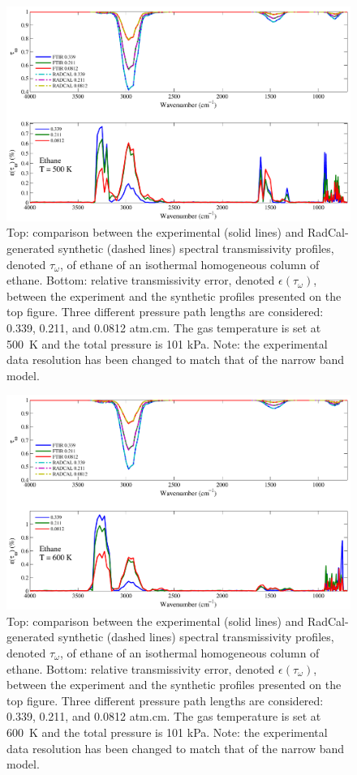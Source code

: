 \begin{figure}[p]
\includegraphics[width=\textwidth]{../Verification/Results_Test2/Ethane_500.pdf}
\caption{Top: comparison between the experimental (solid lines) and RadCal-generated synthetic (dashed lines) spectral transmissivity profiles, denoted $\tau_{\omega}$, of ethane of an isothermal homogeneous column of ethane. Bottom: relative transmissivity error, denoted $\epsilon{(\tau_{\omega})}$, between the experiment and the synthetic profiles presented on the top figure. Three different pressure path lengths are considered: 0.339, 0.211, and 0.0812 atm.cm. The gas temperature is set at 500~K and the total pressure is 101 kPa. Note: the experimental data resolution has been changed to match that of the narrow band model. \label{fig:ethane_Verify_500K}}
\end{figure}

\begin{figure}[p]
\includegraphics[width=\textwidth]{../Verification/Results_Test2/Ethane_600.pdf}
\caption{Top: comparison between the experimental (solid lines) and RadCal-generated synthetic (dashed lines) spectral transmissivity profiles, denoted $\tau_{\omega}$, of ethane of an isothermal homogeneous column of ethane. Bottom: relative transmissivity error, denoted $\epsilon{(\tau_{\omega})}$, between the experiment and the synthetic profiles presented on the top figure. Three different pressure path lengths are considered: 0.339, 0.211, and 0.0812 atm.cm. The gas temperature is set at 600~K and the total pressure is 101 kPa. Note: the experimental data resolution has been changed to match that of the narrow band model. \label{fig:ethane_Verify_600K}}
\end{figure}


